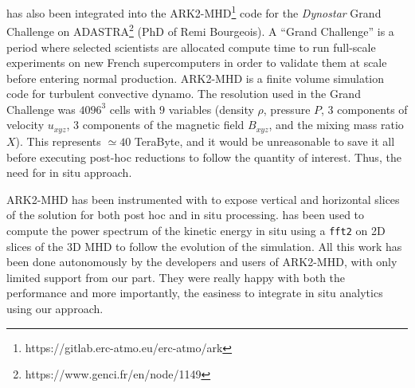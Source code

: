 \deisa has also been integrated into the ARK2-MHD\footnote{https://gitlab.erc-atmo.eu/erc-atmo/ark} code for the \textit{Dynostar} Grand Challenge on {ADASTRA}\footnote{https://www.genci.fr/en/node/1149} (PhD of Remi Bourgeois).
A ``Grand Challenge'' is a period where selected scientists are allocated compute time to run full-scale experiments on new French supercomputers in order to validate them at scale before entering normal production.
ARK2-MHD is a finite volume simulation code for turbulent convective dynamo.
The resolution used in the Grand Challenge was $4096^3$ cells with $9$ variables (density $\rho$, pressure $P$, 3 components of velocity $u_{xyz}$, 3 components of the magnetic field $B_{xyz}$, and the mixing mass ratio $X$).
This represents $\simeq 40$ TeraByte, and it would be unreasonable to save it all before executing post-hoc reductions to follow the quantity of interest.
Thus, the need for in situ approach. 

ARK2-MHD has been instrumented with \pdi to expose vertical and horizontal slices of the solution for both post hoc and in situ processing. 
\deisa has been used to compute the power spectrum of the kinetic energy in situ using a \texttt{fft2} on 2D slices of the 3D MHD to follow the evolution of the simulation. 
All this work has been done autonomously by the developers and users of ARK2-MHD, with only limited support from our part.
They were really happy with both the performance and more importantly, the easiness to integrate in situ analytics using our approach.

